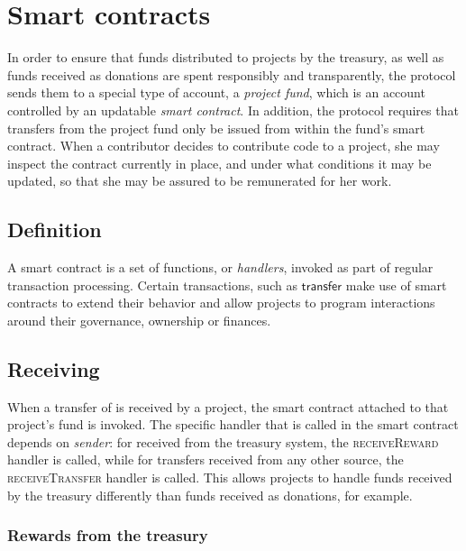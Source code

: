 
\section{Smart contracts}
\label{s:smart-contracts}

\newcommand{\handler}[1]{\textsc{\small#1}}

In order to ensure that funds distributed to projects by the \oscoin{}
treasury, as well as funds received as donations are spent responsibly and
transparently, the protocol sends them to a special type of account, a
\emph{project fund}, which is an account controlled by an updatable \emph{smart
contract}.
In addition, the protocol requires that transfers from the project fund only be
issued from within the fund's smart contract. When a contributor decides to
contribute code to a project, she may inspect the contract currently in place,
and under what conditions it may be updated, so that she may be assured to be
remunerated for her work.

\subsection{Definition}
A smart contract is a set of functions, or \emph{handlers}, invoked as part
of regular transaction processing. Certain transactions, such as $\mathsf{transfer}$
make use of smart contracts to extend their behavior and allow projects to
program interactions around their governance, ownership or finances.

\subsection{Receiving \oscoin{}}

When a transfer of \oscoin{} is received by a project, the smart contract
attached to that project's fund is invoked. The specific handler that is
called in the smart contract depends on \emph{sender}: for \oscoin{} received
from the treasury system, the \handler{receiveReward} handler is called, while
for transfers received from any other source, the \handler{receiveTransfer}
handler is called. This allows projects to handle funds received by the treasury
differently than funds received as donations, for example.

\subsubsection{Rewards from the treasury}

